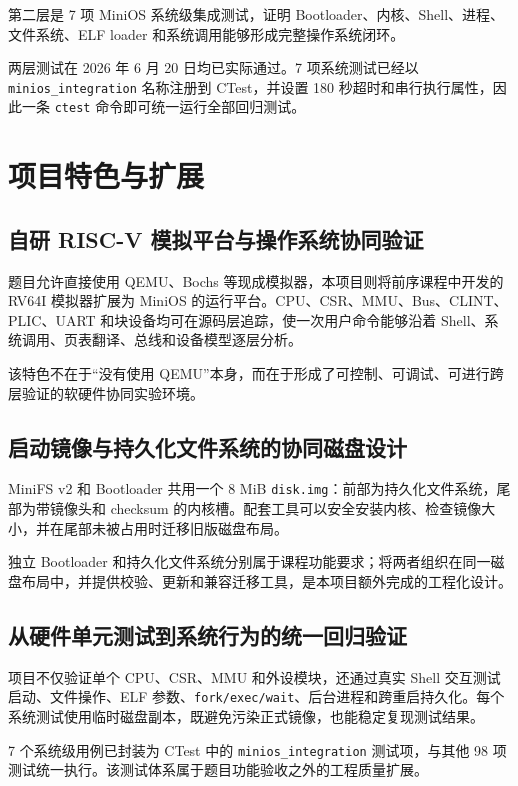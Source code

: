 \documentclass[UTF8,a4paper,12pt,openany,fontset=fandol]{ctexrep}
\begin{document}
第二层是 7 项 MiniOS 系统级集成测试，证明 Bootloader、内核、Shell、进程、文件系统、ELF loader 和系统调用能够形成完整操作系统闭环。

两层测试在 2026 年 6 月 20 日均已实际通过。7 项系统测试已经以 \nolinkurl{minios_integration} 名称注册到 CTest，并设置 180 秒超时和串行执行属性，因此一条 \nolinkurl{ctest} 命令即可统一运行全部回归测试。

\chapter{项目特色与扩展}

\section{自研 RISC-V 模拟平台与操作系统协同验证}

题目允许直接使用 QEMU、Bochs 等现成模拟器，本项目则将前序课程中开发的 RV64I 模拟器扩展为 MiniOS 的运行平台。CPU、CSR、MMU、Bus、CLINT、PLIC、UART 和块设备均可在源码层追踪，使一次用户命令能够沿着 Shell、系统调用、页表翻译、总线和设备模型逐层分析。

该特色不在于“没有使用 QEMU”本身，而在于形成了可控制、可调试、可进行跨层验证的软硬件协同实验环境。

\section{启动镜像与持久化文件系统的协同磁盘设计}

MiniFS v2 和 Bootloader 共用一个 8 MiB \nolinkurl{disk.img}：前部为持久化文件系统，尾部为带镜像头和 checksum 的内核槽。配套工具可以安全安装内核、检查镜像大小，并在尾部未被占用时迁移旧版磁盘布局。

独立 Bootloader 和持久化文件系统分别属于课程功能要求；将两者组织在同一磁盘布局中，并提供校验、更新和兼容迁移工具，是本项目额外完成的工程化设计。

\section{从硬件单元测试到系统行为的统一回归验证}

项目不仅验证单个 CPU、CSR、MMU 和外设模块，还通过真实 Shell 交互测试启动、文件操作、ELF 参数、\nolinkurl{fork/exec/wait}、后台进程和跨重启持久化。每个系统测试使用临时磁盘副本，既避免污染正式镜像，也能稳定复现测试结果。

7 个系统级用例已封装为 CTest 中的 \nolinkurl{minios_integration} 测试项，与其他 98 项测试统一执行。该测试体系属于题目功能验收之外的工程质量扩展。
\end{document}
